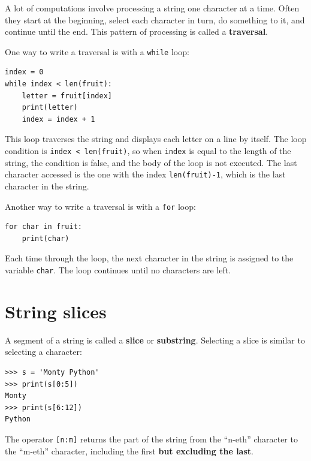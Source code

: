 
A lot of computations involve processing a string one character at a
time.  Often they start at the beginning, select each character in
turn, do something to it, and continue until the end.  This pattern of
processing is called a {\bf traversal}.  

\label{ch6StringTraversal}
One way to write a traversal
is with a {\tt while} loop:

\beforeverb
\begin{verbatim}
index = 0
while index < len(fruit):
    letter = fruit[index]
    print(letter)
    index = index + 1
\end{verbatim}
\afterverb
%
This loop traverses the string and displays each letter on a line by
itself.  The loop condition is {\tt index < len(fruit)}, so
when {\tt index} is equal to the length of the string, the
condition is false, and the body of the loop is not executed.  The
last character accessed is the one with the index {\tt len(fruit)-1},
which is the last character in the string.

Another way to write a traversal is with a {\tt for} loop:

\beforeverb
\begin{verbatim}
for char in fruit:
    print(char)
\end{verbatim}
\afterverb
%
Each time through the loop, the next character in the string is assigned
to the variable {\tt char}.  The loop continues until no characters are
left.


\section{String slices}
\label{slice}


A segment of a string is called a {\bf slice} or {\bf substring}.  Selecting a slice is
similar to selecting a character:

\beforeverb
\begin{verbatim}
>>> s = 'Monty Python'
>>> print(s[0:5])
Monty
>>> print(s[6:12])
Python
\end{verbatim}
\afterverb
%
The operator {\tt [n:m]} returns the part of the string from the 
``n-eth'' character to the ``m-eth'' character, including the first {\bf but
excluding the last}.  

